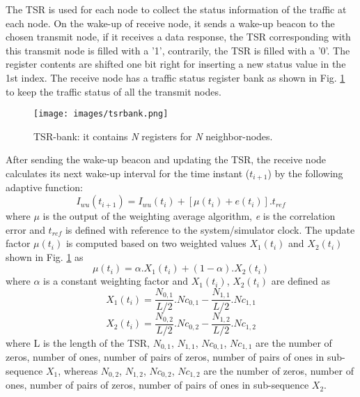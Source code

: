 \documentclass[conference]{IEEEtran}
\begin{document}
The TSR is used for each node to collect the status information of the traffic at each node. On the wake-up of receive node, it sends a wake-up beacon to the chosen transmit node, if it receives a data response, the TSR corresponding with this transmit node is filled with a '1', contrarily, the TSR is filled with a '0'. The register contents are shifted one bit right for inserting a new status value in the 1st index. The receive node has a traffic status register bank as shown in Fig. \ref{fig:tsrbank} to keep the traffic status of all the transmit nodes.

\begin{figure}[!t]
\centering
\texttt{[image: images/tsrbank.png]}
\caption{TSR-bank: it contains \textit{N} registers for \textit{N} neighbor-nodes.}
\label{fig:tsrbank}
\end{figure}

After sending the wake-up beacon and updating the TSR, the receive node calculates its next wake-up interval for the time instant ($ t_{i+1} $) by the following adaptive function:
\begin{equation}
I_{wu}(t_{i+1}) = I_{wu}(t_{i}) + [\mu(t_i) + e(t_i)] . t_{ref}
\end{equation}
where \textit{$\mu$} is the output of the weighting average algorithm, \textit{e} is the correlation error and \textit{$t_{ref}$} is defined with reference to the system/simulator clock. The update factor \textit{$\mu(t_i)$} is computed based on two weighted values \textit{$X_1(t_i)$} and \textit{$X_2(t_i)$} shown in Fig. \ref{fig:tsrbank} as
\begin{equation}
\mu(t_i) = \alpha . X_1(t_i) + (1 - \alpha) . X_2(t_i)
\end{equation}
where \textit{$\alpha$} is a constant weighting factor and \textit{$X_1(t_i)$}, \textit{$X_2(t_i)$} are defined as
\begin{equation}
X_1(t_i) = \frac{N_{0,1}}{L/2} . Nc_{0,1} - \frac{N_{1,1}}{L/2} . Nc_{1,1}
\end{equation}
\begin{equation}
X_2(t_i) = \frac{N_{0,2}}{L/2} . Nc_{0,2} - \frac{N_{1,2}}{L/2} . Nc_{1,2}
\end{equation}
where L is the length of the TSR, \textit{$N_{0,1}$}, \textit{$N_{1,1}$}, \textit{$Nc_{0,1}$}, \textit{$Nc_{1,1}$} are the number of zeros, number of ones, number of pairs of zeros, number of pairs of ones in sub-sequence \textit{$X_1$}, whereas \textit{$N_{0,2}$}, \textit{$N_{1,2}$}, \textit{$Nc_{0,2}$}, \textit{$Nc_{1,2}$} are the number of zeros, number of ones, number of pairs of zeros, number of pairs of ones in sub-sequence \textit{$X_2$}.
\end{document}
